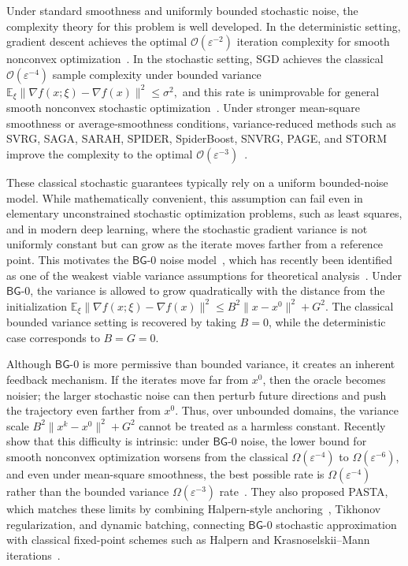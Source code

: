 \documentclass[letter,11pt]{article}
\newcommand{\Ocal}{\mathcal{O}}
\begin{document}
Under standard smoothness and uniformly bounded stochastic noise, the complexity theory for this problem is well developed. In the deterministic setting, gradient descent achieves the optimal \(\Ocal(\varepsilon^{-2})\) iteration complexity for smooth nonconvex optimization~\cite{nesterov2004introductory,nesterov2018lectures}. In the stochastic setting, SGD achieves the classical \(\Ocal(\varepsilon^{-4})\) sample complexity under bounded variance $\mathbb E_\xi \bigl\| \nabla f(x;\xi)-\nabla f(x) \bigr\|^2 \le \sigma^2,$ and this rate is unimprovable for general smooth nonconvex stochastic optimization~\cite{ghadimi2013stochastic,arjevani2023lower}.
Under stronger mean-square smoothness or average-smoothness conditions, variance-reduced methods such as SVRG, SAGA,
SARAH, SPIDER, SpiderBoost, SNVRG, PAGE, and STORM improve the complexity to the optimal $\Ocal(\varepsilon^{-3})$~\cite{johnson2013accelerating,defazio2014saga,nguyen2017sarah,fang2018spider,wang2018spiderboost,zhou2020stochastic,li2021page,cutkosky2019momentum}.

These classical stochastic guarantees typically rely on a uniform bounded-noise model. While mathematically convenient, this assumption can fail even in elementary unconstrained stochastic optimization problems, such as least squares, and in modern deep learning, where the stochastic gradient variance is not uniformly constant but can grow as the iterate moves farther from a reference point. This motivates the $\mathsf{BG}$-0 noise model~\cite{blum1954approximation,gladyshev1965stochastic}, which has recently been identified as one of the weakest viable variance assumptions for theoretical analysis~\cite{alacaoglu2025towards}. Under $\mathsf{BG}$-0, the variance is allowed to grow quadratically with the distance from the initialization 
$\mathbb E_\xi \bigl\| \nabla f(x;\xi)-\nabla f(x) \bigr\|^2 \le B^2\|x-x^0\|^2+G^2.$
The classical bounded variance setting is recovered by taking $B=0$, while the deterministic case corresponds to $B=G=0$.

Although \(\mathsf{BG}\)-0 is more permissive than bounded variance, it creates an inherent feedback mechanism. If the iterates move far from $x^0$, then the oracle becomes noisier; the larger stochastic noise can then perturb future directions and push the trajectory even farther from $x^0$. Thus, over unbounded domains, the variance scale $B^2\|x^k-x^0\|^2+G^2$ cannot be treated as a harmless constant. Recently \citet{fazla2026lower} show that this difficulty is intrinsic: under $\mathsf{BG}$-0 noise, the lower bound for smooth nonconvex optimization worsens from the classical $\Omega(\varepsilon^{-4})$ to $\Omega(\varepsilon^{-6})$, and even under mean-square smoothness, the best possible rate is $\Omega(\varepsilon^{-4})$ rather than the bounded variance $\Omega(\varepsilon^{-3})$ rate~\cite{arjevani2023lower}. They also proposed PASTA, which matches these limits by combining Halpern-style anchoring~\cite{halpern1967fixed}, Tikhonov regularization, and dynamic batching, connecting $\mathsf{BG}$-0 stochastic approximation with classical fixed-point schemes such as Halpern and Krasnoselskii--Mann iterations~\cite{mann1953mean,krasnosel1955two,halpern1967fixed,fazla2026lower}.
\end{document}
